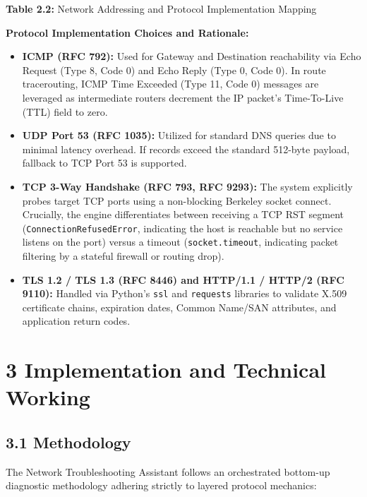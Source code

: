 \documentclass[
]{article}
\providecommand{\tightlist}{%
  \setlength{\itemsep}{0pt}\setlength{\parskip}{0pt}}
\begin{document}
\begin{center}
\textbf{Table 2.2:} Network Addressing and Protocol Implementation Mapping
\end{center}

\vspace{0.2cm}
\textbf{Protocol Implementation Choices and Rationale:}
\begin{itemize}
\tightlist
\item \textbf{ICMP (RFC 792):} Used for Gateway and Destination reachability via Echo Request (Type 8, Code 0) and Echo Reply (Type 0, Code 0). In route tracerouting, ICMP Time Exceeded (Type 11, Code 0) messages are leveraged as intermediate routers decrement the IP packet's Time-To-Live (TTL) field to zero.
\item \textbf{UDP Port 53 (RFC 1035):} Utilized for standard DNS queries due to minimal latency overhead. If records exceed the standard 512-byte payload, fallback to TCP Port 53 is supported.
\item \textbf{TCP 3-Way Handshake (RFC 793, RFC 9293):} The system explicitly probes target TCP ports using a non-blocking Berkeley socket connect. Crucially, the engine differentiates between receiving a TCP RST segment (\texttt{ConnectionRefusedError}, indicating the host is reachable but no service listens on the port) versus a timeout (\texttt{socket.timeout}, indicating packet filtering by a stateful firewall or routing drop).
\item \textbf{TLS 1.2 / TLS 1.3 (RFC 8446) and HTTP/1.1 / HTTP/2 (RFC 9110):} Handled via Python's \texttt{ssl} and \texttt{requests} libraries to validate X.509 certificate chains, expiration dates, Common Name/SAN attributes, and application return codes.
\end{itemize}

\newpage

\section{3 Implementation and Technical Working}\label{implementation-and-technical-working}

\subsection{3.1 Methodology}\label{methodology}

The Network Troubleshooting Assistant follows an orchestrated bottom-up diagnostic methodology adhering strictly to layered protocol mechanics:
\end{document}
